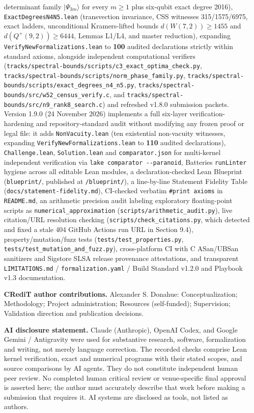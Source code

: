 \documentclass[11pt,a4paper]{article}
\begin{document}
determinant family \(|\Psi_{3m}\rangle\) for every \(m\ge1\) plus six-qubit exact degree 2016),
\nolinkurl{ExactDegreesN4N5.lean} (transvection invariance, CSS witnesses 315/1575/6975, exact ladders, unconditional
Kramers-lifted bounds \(d(W(7,2))\ge1455\) and \(d(Q^+(9,2))\ge6444\), Lemmas L1/L4, and master reduction),
expanding \nolinkurl{VerifyNewFormalizations.lean} to \textbf{100} audited declarations strictly within standard axioms,
alongside independent computational verifiers (\nolinkurl{tracks/spectral-bounds/scripts/c3_exact_optima_check.py},
\nolinkurl{tracks/spectral-bounds/scripts/norm_phase_family.py}, \nolinkurl{tracks/spectral-bounds/scripts/exact_degrees_n4_n5.py}, \nolinkurl{tracks/spectral-bounds/src/w52_census_verify.c}, and
\nolinkurl{tracks/spectral-bounds/src/n9_rank8_search.c}) and refreshed v1.8.0 submission packets.
Version 1.9.0 (24 November 2026) implements a full six-layer verification-hardening and repository-standard
audit without modifying any frozen proof or legal file: it adds \texttt{NonVacuity.lean} (ten existential
non-vacuity witnesses, expanding \nolinkurl{VerifyNewFormalizations.lean} to \textbf{110} audited declarations),
\texttt{Challenge.lean}, \texttt{Solution.lean} and \texttt{comparator.json} for multi-kernel independent verification via
\texttt{lake\ comparator\ -\/-paranoid}, Batteries \texttt{runLinter} hygiene across all editable Lean modules, a
declaration-checked Lean Blueprint (\texttt{blueprint/}, published at \texttt{/blueprint/}), a line-by-line Statement
Fidelity Table (\nolinkurl{docs/statement-fidelity.md}), CI-checked verbatim \texttt{\#print\ axioms} in \texttt{README.md}, an
arithmetic precision audit labeling exploratory floating-point scripts as \nolinkurl{numerical_approximation}
(\nolinkurl{scripts/arithmetic_audit.py}), live citation/URL resolution checking (\nolinkurl{scripts/check_citations.py},
which detected and fixed a stale 404 GitHub Actions run URL in Section 9.4), property/mutation/fuzz tests
(\nolinkurl{tests/test_properties.py}, \nolinkurl{tests/test_mutation_and_fuzz.py}), cross-platform CI with C ASan/UBSan
sanitizers and Sigstore SLSA release provenance attestations, and transparent \texttt{LIMITATIONS.md} /
\nolinkurl{formalization.yaml} / Build Standard v1.2.0 and Playbook v1.3 documentation.

\textbf{CRediT author contributions.} Alexander S. Donahue: Conceptualization; Methodology; Project administration; Resources (self-funded); Supervision; Validation direction and publication decisions.

\textbf{AI disclosure statement.} Claude (Anthropic), OpenAI Codex, and Google Gemini / Antigravity were
used for substantive research, software, formalization and writing, not merely language correction. The
recorded checks comprise Lean kernel verification, exact and numerical programs with their stated
scopes, and source comparisons by AI agents. They do not constitute independent human peer review. No
completed human critical review or venue-specific final approval is asserted here; the author must
accurately describe that work before making a submission that requires it. AI systems are disclosed as
tools, not listed as authors.
\end{document}
